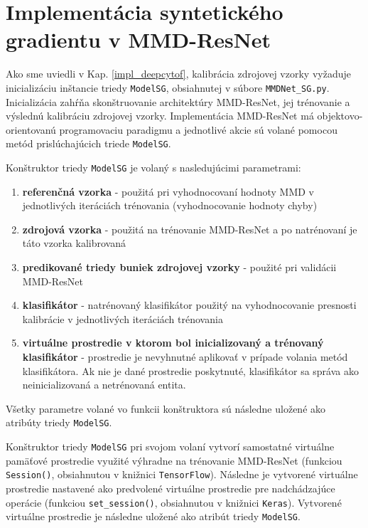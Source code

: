 \section{Implementácia syntetického gradientu v MMD-ResNet}
\label{implementacia_MMD-ResNet}

Ako sme uviedli v Kap. \ref{impl_deepcytof}, kalibrácia zdrojovej vzorky vyžaduje inicializáciu inštancie triedy \texttt{ModelSG}, obsiahnutej v súbore \texttt{MMDNet_SG.py}. Inicializácia zahŕňa skonštruovanie architektúry MMD-ResNet, jej trénovanie a výslednú kalibráciu zdrojovej vzorky. Implementácia MMD-ResNet má objektovo-orientovanú programovaciu paradigmu a jednotlivé akcie sú volané pomocou metód prislúchajúcich triede \texttt{ModelSG}. 

Konštruktor triedy \texttt{ModelSG} je volaný s nasledujúcimi parametrami:
\begin{enumerate}
    \item \textbf{referenčná vzorka} - použitá pri vyhodnocovaní hodnoty MMD v jednotlivých iteráciách trénovania (vyhodnocovanie hodnoty chyby)
    \item \textbf{zdrojová vzorka} - použitá na trénovanie MMD-ResNet a po natrénovaní je táto vzorka kalibrovaná
    \item \textbf{predikované triedy buniek zdrojovej vzorky} - použité pri validácii MMD-ResNet
    \item \textbf{klasifikátor} - natrénovaný klasifikátor použitý na vyhodnocovanie presnosti kalibrácie v jednotlivých iteráciách trénovania
    \item \textbf{virtuálne prostredie v ktorom bol inicializovaný a trénovaný klasifikátor} - prostredie je nevyhnutné aplikovať v prípade volania metód klasifikátora. Ak nie je dané prostredie poskytnuté, klasifikátor sa správa ako neinicializovaná a netrénovaná entita.
\end{enumerate}
Všetky parametre volané vo funkcii konštruktora sú následne uložené ako atribúty triedy \texttt{ModelSG}.

Konštruktor triedy \texttt{ModelSG} pri svojom volaní vytvorí samostatné virtuálne pamäťové prostredie využité výhradne na trénovanie MMD-ResNet (funkciou \texttt{Session()}, obsiahnutou v knižnici \texttt{TensorFlow}). Následne je vytvorené virtuálne prostredie nastavené ako predvolené virtuálne prostredie pre nadchádzajúce operácie (funkciou \texttt{set_session()}, obsiahnutou v knižnici \texttt{Keras}). Vytvorené virtuálne prostredie je následne uložené ako atribút triedy \texttt{ModelSG}.

